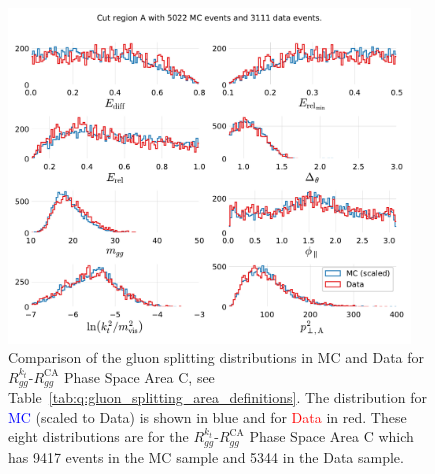 \begin{figure}[h!]
  \centerfloat
  \includegraphics[width=0.95\textwidth, trim=0 0 0 0, clip, page=3]{figures/quarks/gtag-R_kt_CA_histograms-down_sample=1.00-ML_vars=vertex-selection=b-ejet_min=4-n_iter_RS_lgb=99-n_iter_RS_xgb=9-cdot_cut=0.90-version=19-njet=4.pdf}
  \caption[Gluon Splitting Distribution Comparison in MC and Data for $R_{gg}^{k_t}$-$R_{gg}^\mathrm{CA}$ Phase Space Area C]
          {Comparison of the gluon splitting distributions in MC and Data for $R_{gg}^{k_t}$-$R_{gg}^\mathrm{CA}$ Phase Space Area C, see Table~\ref{tab:q:gluon_splitting_area_definitions}. The distribution for \textcolor{blue}{MC} (scaled to Data) is shown in blue and for \textcolor{red}{Data} in red. These eight distributions are for the $R_{gg}^{k_t}$-$R_{gg}^\mathrm{CA}$ Phase Space Area C which has \num{9417} events in the MC sample and \num{5344} in the Data sample. } 
  \label{fig:q:R_kt_CA_cut_C}
\end{figure}

